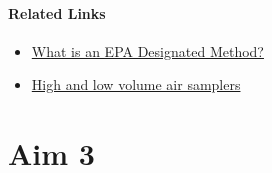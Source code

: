 \documentclass{article}
\begin{document}
\paragraph{Related Links}
\begin{itemize}
    \item \href{http://themetoneinstrumentsmonitor.blogspot.com/2012/01/what-is-epa-designated-method.html}{What is an EPA Designated Method?}
    \item \href{https://www.qld.gov.au/environment/pollution/monitoring/air-pollution/samplers}{High and low volume air samplers}
\end{itemize}

\section{Aim 3}
\end{document}
